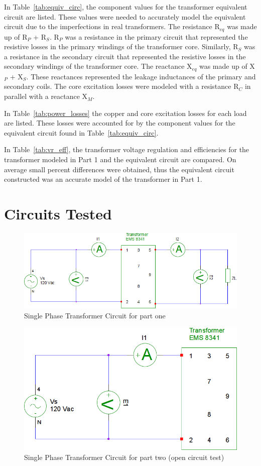 \documentclass{article}
\begin{document}
In Table~\ref{tab:equiv_circ}, the component values for the transformer equivalent circuit are listed. These
values were needed to accurately model the equivalent circuit due to the imperfections in real transformers. The
resistance R$_{eq}$ was made up of R$_P$ + R$_S$. R$_P$ was a resistance in the primary circuit that represented the
resistive losses in the primary windings of the transformer core. Similarly, R$_S$ was a resistance in the secondary
circuit that represented the resistive losses in the secondary windings of the
transformer core. The reactance X$_{eq}$
was made up of X$_P$ + X$_S$. These reactances represented the leakage inductances of the primary and secondary coils.
The core excitation losses were modeled with a resistance R$_C$ in parallel with a reactance X$_M$.

In Table~\ref{tab:power_losses} the copper and core excitation losses for each load are listed. These losses were
accounted for by the component values for the equivalent circuit found in Table~\ref{tab:equiv_circ}.

In Table~\ref{tab:vr_eff}, the transformer voltage regulation and efficiencies for the transformer modeled in Part 1
and the equivalent circuit are compared. On average small percent differences were obtained, thus the equivalent
circuit constructed was an accurate model of the transformer in Part 1.

\section*{Circuits Tested}
\begin{figure}[H]
  \centering
  \includegraphics[width=.8\textwidth]{img/circuit_01}
  \caption{Single Phase Transformer Circuit for part one}
  \label{fig:circuit_01}
\end{figure}

\begin{figure}[H]
  \centering
  \includegraphics[width=.8\textwidth]{img/circuit_02}
  \caption{Single Phase Transformer Circuit for part two (open circuit test)}
  \label{fig:circuit_02}
\end{figure}
\end{document}
